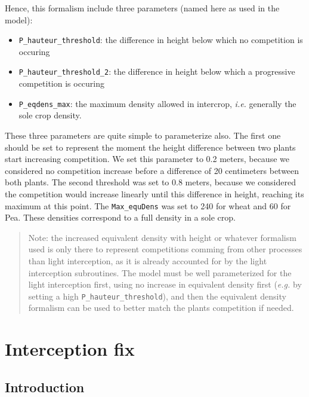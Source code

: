 \documentclass[
]{book}
\providecommand{\tightlist}{%
  \setlength{\itemsep}{0pt}\setlength{\parskip}{0pt}}
\begin{document}
Hence, this formalism include three parameters (named here as used in the model):

\begin{itemize}
\tightlist
\item
  \texttt{P\_hauteur\_threshold}: the difference in height below which no competition is occuring
\item
  \texttt{P\_hauteur\_threshold\_2}: the difference in height below which a progressive competition is occuring
\item
  \texttt{P\_eqdens\_max}: the maximum density allowed in intercrop, \emph{i.e.} generally the sole crop density.
\end{itemize}

These three parameters are quite simple to parameterize also. The first one should be set to represent the moment the height difference between two plants start increasing competition. We set this parameter to 0.2 meters, because we considered no competition increase before a difference of 20 centimeters between both plants. The second threshold was set to 0.8 meters, because we considered the competition would increase linearly until this difference in height, reaching its maximum at this point. The \texttt{Max\_equDens} was set to 240 for wheat and 60 for Pea. These densities correspond to a full density in a sole crop.

\begin{quote}
Note: the increased equivalent density with height or whatever formalism used is only there to represent competitions comming from other processes than light interception, as it is already accounted for by the light interception subroutines. The model must be well parameterized for the light interception first, using no increase in equivalent density first (\emph{e.g.} by setting a high \texttt{P\_hauteur\_threshold}), and then the equivalent density formalism can be used to better match the plants competition if needed.
\end{quote}

\hypertarget{intercfix}{%
\chapter{Interception fix}\label{intercfix}}

\hypertarget{introduction-12}{%
\section{Introduction}\label{introduction-12}}
\end{document}
